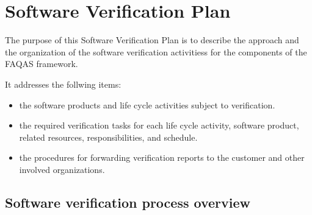 \chapter{Software Verification Plan}





The purpose of this Software Verification Plan is to describe the approach and the organization of the software verification activitiess for the components of the FAQAS framework.

It addresses the follwing items:
\begin{itemize}
  \item the software products and life cycle activities
  subject to verification.
  \item the required verification tasks for each life cycle activity, software product, related resources, responsibilities, and schedule.
  \item the procedures for forwarding verification reports to the customer and other involved organizations.
\end{itemize}

\section{Software verification process overview}

